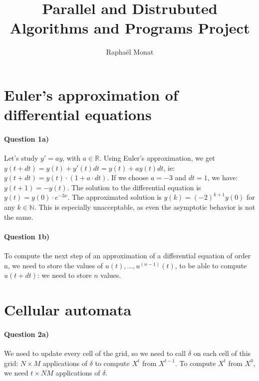 \documentclass[a4paper,12pt]{article}
\title{Parallel and Distrubuted Algorithms and Programs Project}
\author{Raphaël Monat}
\begin{document}
\maketitle

\tableofcontents

\section{Euler's approximation of differential equations}

\paragraph{Question 1a)}
Let's study $y' = ay$, with $a \in \mathbb{R}$. Using Euler's approximation, we get $y(t + dt) = y(t) + y'(t)dt = y(t) + a y(t) dt$, ie: $y(t + dt) = y(t) \cdot (1 + a \cdot dt)$. If we choose $a = -3$ and $dt = 1$, we have: $y(t+1) = - y(t)$. The solution to the differential equation is $y(t) = y(0) \cdot e^{-3x}$. The approximated solution is $y(k) = (-2)^{k+1}y(0)$ for any $k \in \mathbb{N}$. This is especially unacceptable, as even the asymptotic behavior is not the same.

\paragraph{Question 1b)} To compute the next step of an approximation of a differential equation of order n, we need to store the values of $u(t), ..., u^{(n-1)}(t)$, to be able to compute $u(t+dt)$: we need to store $n$ values.

\section{Cellular automata}

\paragraph{Question 2a)} We need to update every cell of the grid, so we need to call $\delta$ on each cell of this grid: $N \times M$ applications of $\delta$ to compute $X^t$ from $X^{t-1}$. To compute $X^t$ from $X^0$, we need $t \times NM$ applications of $\delta$.
\end{document}
